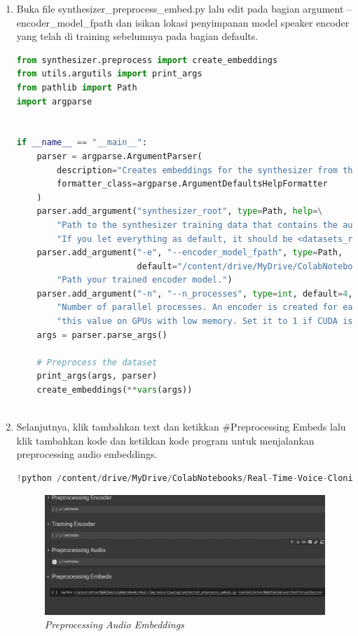 \begin{enumerate}
\item Buka file synthesizer\_preprocess\_embed.py lalu edit pada bagian argument --encoder\_model\_fpath dan isikan lokasi penyimpanan model speaker encoder yang telah di training sebelumnya pada bagian defaults.

\begin{lstlisting}[language=Python, caption=Training Speaker Encoder Model]
from synthesizer.preprocess import create_embeddings
from utils.argutils import print_args
from pathlib import Path
import argparse


if __name__ == "__main__":
    parser = argparse.ArgumentParser(
        description="Creates embeddings for the synthesizer from the LibriSpeech utterances.",
        formatter_class=argparse.ArgumentDefaultsHelpFormatter
    )
    parser.add_argument("synthesizer_root", type=Path, help=\
        "Path to the synthesizer training data that contains the audios and the train.txt file. "
        "If you let everything as default, it should be <datasets_root>/SV2TTS/synthesizer/.")
    parser.add_argument("-e", "--encoder_model_fpath", type=Path,
                        default="/content/drive/MyDrive/ColabNotebooks/Real-Time-Voice-Cloning/encoder/saved_models/pretrained.pt", help=\
        "Path your trained encoder model.")
    parser.add_argument("-n", "--n_processes", type=int, default=4, help= \
        "Number of parallel processes. An encoder is created for each, so you may need to lower "
        "this value on GPUs with low memory. Set it to 1 if CUDA is unhappy.")
    args = parser.parse_args()

    # Preprocess the dataset
    print_args(args, parser)
    create_embeddings(**vars(args))
    
\end{lstlisting}

\item Selanjutnya, klik tambahkan text dan ketikkan \#Preprocessing Embeds lalu klik tambahkan kode dan ketikkan kode program untuk menjalankan preprocessing audio embeddings. 

\begin{lstlisting}[language=Python, caption=Preprocessing Embeds]
!python /content/drive/MyDrive/ColabNotebooks/Real-Time-Voice-Cloning/synthesizer_preprocess_embeds.py /content/drive/MyDrive/dataset/SV2TTS/synthesizer
\end{lstlisting}

\begin{figure}[H]
    \centering
    \includegraphics[scale=0.33]{figures/colab13}
    \caption{\textit{Preprocessing Audio Embeddings}}
    \label{colab13}
\end{figure}


\end{enumerate}
